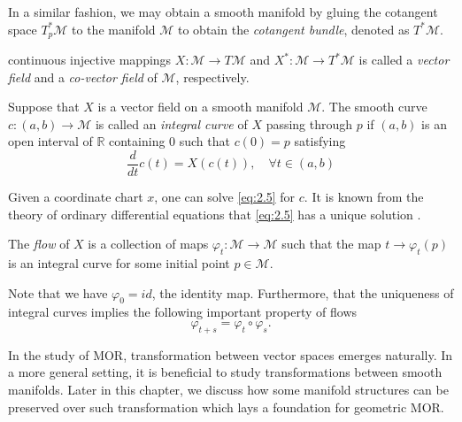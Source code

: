 In a similar fashion, we may obtain a smooth manifold by gluing the cotangent space $T^*_p \mathcal M$ to the manifold $\mathcal M$ to obtain the \emph{cotangent bundle}, denoted as $T^* \mathcal M$. 

\begin{definition}
continuous injective mappings $X:\mathcal M \to T \mathcal M$ and $X^*:\mathcal M \to T^* \mathcal M$ is called a \emph{vector field} and a \emph{co-vector field} of $\mathcal M$, respectively.
\end{definition}

\begin{definition}
Suppose that $X$ is a vector field on a smooth manifold $\mathcal M$. The smooth curve $c:(a,b)\to \mathcal M$ is called an \emph{integral curve} of $X$ passing through $p$ if $(a,b)$ is an open interval of $\mathbb R$ containing $0$ such that  $c(0)=p$ satisfying
\begin{equation} \label{eq:2.5}
	\frac{d}{dt}c(t) = X(c(t)), \quad \forall t\in(a,b) 
\end{equation}
\end{definition}
Given a coordinate chart $x$, one can solve \cref{eq:2.5} for $c$. It is known from the theory of ordinary differential equations that \cref{eq:2.5} has a unique solution \cite{teschl2012ordinary}. 
\begin{definition}
	The \emph{flow} of $X$ is a collection of maps $\varphi_t : \mathcal M \to \mathcal M$ such that the map $t \to \varphi_t(p)$ is an integral curve for some initial point $p\in \mathcal M$.
\end{definition}
Note that we have $\varphi_0 = id$, the identity map. Furthermore, that the uniqueness of integral curves implies the following important property of flows
\begin{equation} \label{eq:2.51}
	\varphi_{t+s} = \varphi_t \circ \varphi_s.
\end{equation}

In the study of MOR, transformation between vector spaces emerges naturally. In a more general setting, it is beneficial to study transformations between smooth manifolds. Later in this chapter, we discuss how some manifold structures can be preserved over such transformation which lays a foundation for geometric MOR.

